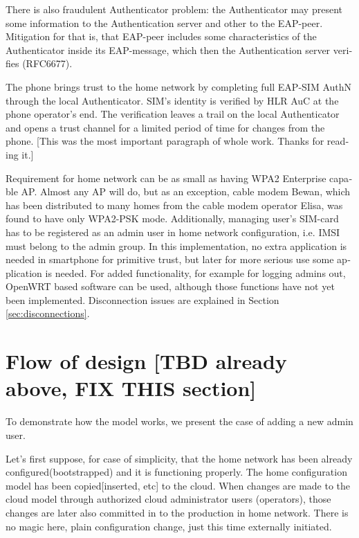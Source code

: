 \documentclass[12pt,a4paper,english]{tutthesis}
\begin{document}
\begin{otherlanguage}{english}
There is also fraudulent Authenticator problem: the Authenticator may present some 
information to the Authentication server and other to the EAP-peer.
Mitigation for that is, that EAP-peer includes some 
characteristics of the Authenticator inside its EAP-message, which
then the Authentication server verifies (RFC6677)\cite{rfc6677}.



The phone brings trust to the home network by completing full EAP-SIM AuthN through
the local Authenticator. SIM's identity is verified by HLR AuC at the phone
operator's end. The verification leaves a trail on the local Authenticator and
opens a trust channel for a limited period of time for changes from the phone.
[This was the most important paragraph of whole work. Thanks for
reading it.]





Requirement for home network can be as small as having WPA2 Enterprise capable
AP. Almost any AP will do, but as an exception, cable modem Bewan, which 
has been distributed to many homes from the cable modem operator Elisa, was found to have only WPA2-PSK mode.
Additionally, managing user's SIM-card has to be registered as an admin user in home network 
configuration, i.e. IMSI must belong to the admin group.
In this implementation, no extra application is needed in smartphone
for primitive trust, but later for more serious use some application is needed.
For added functionality, for example for logging admins out, OpenWRT
based software can be used, although those functions have not yet been
implemented. Disconnection issues are explained in Section
\ref{sec:disconnections}.

\section{Flow of design [TBD already above, FIX THIS section]}
\label{sec-4-2}




To demonstrate how the model works, we present the case of adding a
new admin user.

Let's first suppose, for case of simplicity, that the home network has been
already configured(bootstrapped) and it is functioning properly.  The
home configuration model has been copied[inserted, etc] to the cloud.
When changes are made to the cloud model through authorized cloud
administrator users (operators), those changes are later also committed
in to the production in home network. There is no magic here, plain
configuration change, just this time externally initiated.


\end{otherlanguage}
\end{document}
